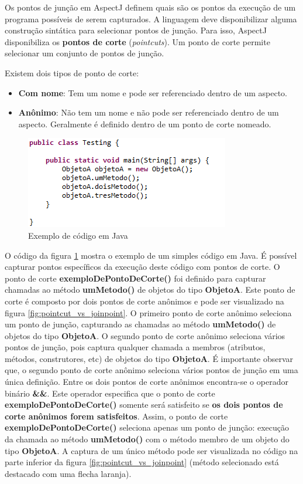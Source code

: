 Os pontos de junção em AspectJ definem quais são os pontos da execução de um programa possíveis de serem capturados. A linguagem deve disponibilizar
alguma construção sintática para selecionar pontos de junção. Para isso, AspectJ disponibiliza os \textbf{pontos de corte} (\textit{pointcuts}). Um
ponto de corte permite selecionar um conjunto de pontos de junção. 

Existem dois tipos de ponto de corte:

\begin{itemize}
  \item \textbf{Com nome}: Tem um nome e pode ser referenciado dentro de um
  aspecto.
  \item \textbf{Anônimo}: Não tem um nome e não pode ser referenciado dentro de
  um aspecto. Geralmente é definido dentro de um ponto de corte nomeado.
\end{itemize}

\begin{figure}[!hb]
	\centering
	\includegraphics{img/pointcut_code.png}
	\caption{Exemplo de código em Java}\label{fig:pointcut_code}
\end{figure}

O código da figura \ref{fig:pointcut_code} mostra o exemplo de um simples código
em Java. É possível capturar pontos específicos da execução deste código
com pontos de corte. O ponto de corte \textbf{exemploDePontoDeCorte()} foi
definido para capturar chamadas ao método \textbf{umMetodo()} de objetos do tipo \textbf{ObjetoA}. 
Este ponto de corte é composto por dois pontos de corte anônimos e pode ser 
visualizado na figura \ref{fig:pointcut_vs_joinpoint}. O primeiro ponto de corte
anônimo seleciona um ponto de junção, capturando as chamadas ao método \textbf{umMetodo()} de 
objetos do tipo \textbf{ObjetoA}. O segundo ponto de corte anônimo seleciona vários
pontos de junção, pois captura qualquer chamada a membros (atributos, métodos,
construtores, etc) de objetos do tipo \textbf{ObjetoA}. 
É importante observar que, o segundo ponto de corte anônimo seleciona vários
pontos de junção em uma única definição. Entre os dois pontos de corte anônimos 
encontra-se o operador binário \textbf{\&\&}. Este operador especifica que o ponto de corte
\textbf{exemploDePontoDeCorte()} somente será satisfeito se \textbf{os dois
pontos de corte anônimos forem satisfeitos}. Assim, o ponto de corte
\textbf{exemploDePontoDeCorte()} seleciona apenas um ponto de junção: execução da
chamada ao método \textbf{umMetodo()} com o método membro de um objeto do
tipo \textbf{ObjetoA}. A captura de um único método pode ser visualizada no
código na parte inferior da figura \ref{fig:pointcut_vs_joinpoint}
(método selecionado está destacado com uma flecha laranja).

